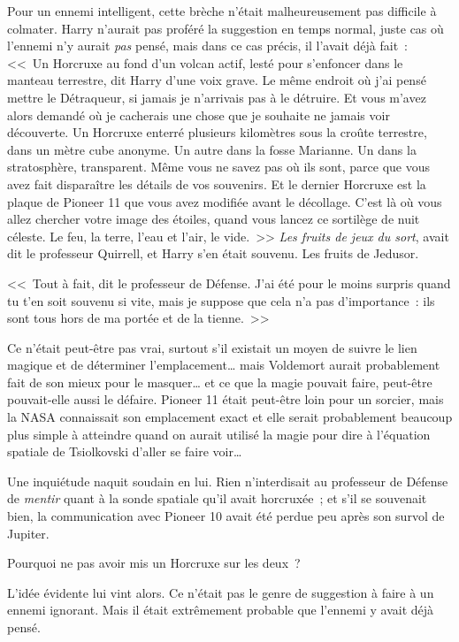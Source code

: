 Pour un ennemi intelligent, cette brèche n'était malheureusement pas difficile à colmater. Harry n'aurait pas proféré la suggestion en temps normal, juste cas où l'ennemi n'y aurait \emph{pas} pensé, mais dans ce cas précis, il l'avait déjà fait~: <<~Un Horcruxe au fond d'un volcan actif, lesté pour s'enfoncer dans le manteau terrestre, dit Harry d'une voix grave. Le même endroit où j'ai pensé mettre le Détraqueur, si jamais je n'arrivais pas à le détruire. Et vous m'avez alors demandé où je cacherais une chose que je souhaite ne jamais voir découverte. Un Horcruxe enterré plusieurs kilomètres sous la croûte terrestre, dans un mètre cube anonyme. Un autre dans la fosse Marianne. Un dans la stratosphère, transparent. Même vous ne savez pas où ils sont, parce que vous avez fait disparaître les détails de vos souvenirs. Et le dernier Horcruxe est la plaque de Pioneer 11 que vous avez modifiée avant le décollage. C'est là où vous allez chercher votre image des étoiles, quand vous lancez ce sortilège de nuit céleste. Le feu, la terre, l'eau et l'air, le vide.~>> \emph{Les fruits de jeux du sort}, avait dit le professeur Quirrell, et Harry s'en était souvenu. Les fruits de Jedusor.

<<~Tout à fait, dit le professeur de Défense. J'ai été pour le moins surpris quand tu t'en soit souvenu si vite, mais je suppose que cela n'a pas d'importance~: ils sont tous hors de ma portée et de la tienne.~>>

Ce n'était peut-être pas vrai, surtout s'il existait un moyen de suivre le lien magique et de déterminer l'emplacement… mais Voldemort aurait probablement fait de son mieux pour le masquer… et ce que la magie pouvait faire, peut-être pouvait-elle aussi le défaire. Pioneer 11 était peut-être loin pour un sorcier, mais la NASA connaissait son emplacement exact et elle serait probablement beaucoup plus simple à atteindre quand on aurait utilisé la magie pour dire à l'équation spatiale de Tsiolkovski d'aller se faire voir…

Une inquiétude naquit soudain en lui. Rien n'interdisait au professeur de Défense de \emph{mentir} quant à la sonde spatiale qu'il avait horcruxée~; et s'il se souvenait bien, la communication avec Pioneer 10 avait été perdue peu après son survol de Jupiter.

Pourquoi ne pas avoir mis un Horcruxe sur les deux~?

L'idée évidente lui vint alors. Ce n'était pas le genre de suggestion à faire à un ennemi ignorant. Mais il était extrêmement probable que l'ennemi y avait déjà pensé.

